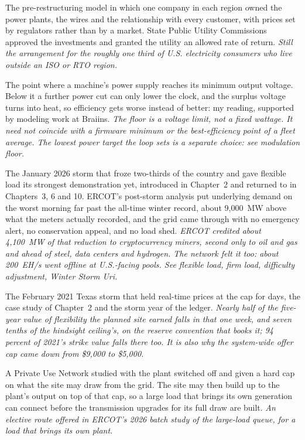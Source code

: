 \begin{description}[leftmargin=0pt,style=unboxed,itemsep=0.35em,parsep=0.15em]
\item[vertically integrated utility monopoly] \hypertarget{glossary:vertically-integrated-utility-monopoly}{}The pre-restructuring model in which one company in each region owned the power plants, the wires and the relationship with every customer, with prices set by regulators rather than by a market. State Public Utility Commissions approved the investments and granted the utility an allowed rate of return. \emph{Still the arrangement for the roughly one third of U.S. electricity consumers who live outside an ISO or RTO region.}
\item[V-floor] \hypertarget{glossary:v-floor}{}The point where a machine's power supply reaches its minimum output voltage. Below it a further power cut can only lower the clock, and the surplus voltage turns into heat, so efficiency gets worse instead of better: my reading, supported by modeling work at Braiins. \emph{The floor is a voltage limit, not a fixed wattage. It need not coincide with a firmware minimum or the best-efficiency point of a fleet average. The lowest power target the loop sets is a separate choice: see modulation floor.}
\item[Winter Storm Fern (Fern)] \hypertarget{glossary:winter-storm-fern}{}The January 2026 storm that froze two-thirds of the country and gave flexible load its strongest demonstration yet, introduced in Chapter~2 and returned to in Chapters~3, 6 and 10. ERCOT's post-storm analysis put underlying demand on the worst morning far past the all-time winter record, about 9,000~MW above what the meters actually recorded, and the grid came through with no emergency alert, no conservation appeal, and no load shed. \emph{ERCOT credited about 4,100~MW of that reduction to cryptocurrency miners, second only to oil and gas and ahead of steel, data centers and hydrogen. The network felt it too: about 200~EH/s went offline at U.S.-facing pools. See flexible load, firm load, difficulty adjustment, Winter Storm Uri.}
\item[Winter Storm Uri (Uri)] \hypertarget{glossary:winter-storm-uri}{}The February 2021 Texas storm that held real-time prices at the cap for days, the case study of Chapter~2 and the storm year of the ledger. \emph{Nearly half of the five-year value of flexibility the planned site earned falls in that one week, and seven tenths of the hindsight ceiling's, on the reserve convention that books it; 94 percent of 2021's strike value falls there too. It is also why the system-wide offer cap came down from \$9,000 to \$5,000.}
\item[Withdrawal-Limited Private Use Network (WLPUN)] \hypertarget{glossary:withdrawal-limited-private-use-network}{}A Private Use Network studied with the plant switched off and given a hard cap on what the site may draw from the grid. The site may then build up to the plant's output on top of that cap, so a large load that brings its own generation can connect before the transmission upgrades for its full draw are built. \emph{An elective route offered in ERCOT's 2026 batch study of the large-load queue, for a load that brings its own plant.}
\end{description}
\endgroup

